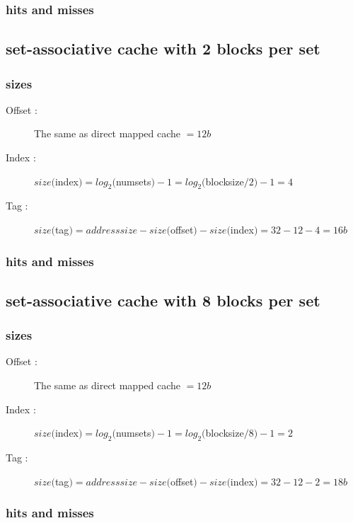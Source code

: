 \documentclass[11pt]{article}
\begin{document}
      \subsubsection{hits and misses}

    \subsection{set-associative cache with 2 blocks per set}
    
      \subsubsection{sizes}
        \begin{description}
          \item[Offset : ] The same as direct mapped cache $ = 12 b$
          \item[Index : ] $size($index$) = log_2($numsets$) -1 = log_2($blocksize$/2) -1 = 4$
          \item[Tag : ] $size($tag$) = addresssize- size($offset$) - size($index$) = 32 - 12 -4 = 16b$
        \end{description}
        
      \subsubsection{hits and misses}

    \subsection{set-associative cache with 8 blocks per set}
    
      \subsubsection{sizes}
        \begin{description}
          \item[Offset : ] The same as direct mapped cache $ = 12 b$
          \item[Index : ] $size($index$) = log_2($numsets$) -1 = log_2($blocksize$/8) - 1 = 2$
          \item[Tag : ] $size($tag$) = addresssize- size($offset$) - size($index$) = 32 - 12 -2 = 18b$
        \end{description}
        
      \subsubsection{hits and misses}
\end{document}
